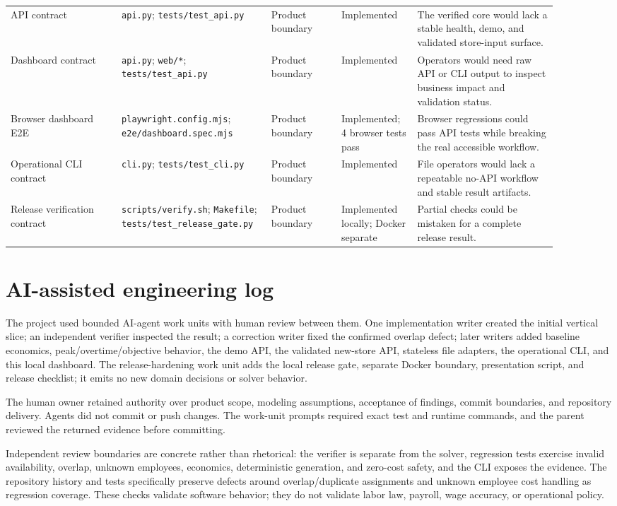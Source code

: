 \documentclass[11pt,a4paper]{article}
\begin{document}
\begin{longtable}{p{0.19\linewidth}p{0.22\linewidth}p{0.12\linewidth}p{0.13\linewidth}p{0.24\linewidth}}
API contract & \texttt{api.py}; \texttt{tests/test\_api.py} & Product boundary & Implemented & The verified core would lack a stable health, demo, and validated store-input surface.\\
Dashboard contract & \texttt{api.py}; \texttt{web/*}; \texttt{tests/test\_api.py} & Product boundary & Implemented & Operators would need raw API or CLI output to inspect business impact and validation status.\\
Browser dashboard E2E & \texttt{playwright.config.mjs}; \texttt{e2e/dashboard.spec.mjs} & Product boundary & Implemented; 4 browser tests pass & Browser regressions could pass API tests while breaking the real accessible workflow.\\
Operational CLI contract & \texttt{cli.py}; \texttt{tests/test\_cli.py} & Product boundary & Implemented & File operators would lack a repeatable no-API workflow and stable result artifacts.\\
Release verification contract & \texttt{scripts/verify.sh}; \texttt{Makefile}; \texttt{tests/test\_release\_gate.py} & Product boundary & Implemented locally; Docker separate & Partial checks could be mistaken for a complete release result.\\
\bottomrule
\end{longtable}

\section{AI-assisted engineering log}
The project used bounded AI-agent work units with human review between them. One implementation writer created the initial vertical slice; an independent verifier inspected the result; a correction writer fixed the confirmed overlap defect; later writers added baseline economics, peak/overtime/objective behavior, the demo API, the validated new-store API, stateless file adapters, the operational CLI, and this local dashboard. The release-hardening work unit adds the local release gate, separate Docker boundary, presentation script, and release checklist; it emits no new domain decisions or solver behavior.

The human owner retained authority over product scope, modeling assumptions, acceptance of findings, commit boundaries, and repository delivery. Agents did not commit or push changes. The work-unit prompts required exact test and runtime commands, and the parent reviewed the returned evidence before committing.

Independent review boundaries are concrete rather than rhetorical: the verifier is separate from the solver, regression tests exercise invalid availability, overlap, unknown employees, economics, deterministic generation, and zero-cost safety, and the CLI exposes the evidence. The repository history and tests specifically preserve defects around overlap/duplicate assignments and unknown employee cost handling as regression coverage. These checks validate software behavior; they do not validate labor law, payroll, wage accuracy, or operational policy.
\end{document}
